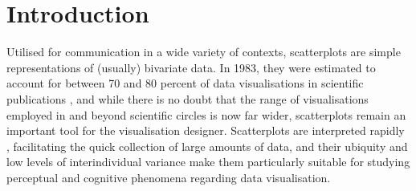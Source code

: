\documentclass[sigconf]{acmart}
\begin{document}



\maketitle

\setlength{\parskip}{-0.1pt}

\section{Introduction}\label{sec-intro}

Utilised for communication in a wide variety of contexts, scatterplots
are simple representations of (usually) bivariate data. In 1983, they
were estimated to account for between 70 and 80 percent of data
visualisations in scientific publications \citep{tufte_1983}, and while
there is no doubt that the range of visualisations employed in and
beyond scientific circles is now far wider, scatterplots remain an
important tool for the visualisation designer. Scatterplots are
interpreted rapidly \citep{rensink_2014}, facilitating the quick
collection of large amounts of data, and their ubiquity
\citep{tufte_1983} and low levels of interindividual variance
\citep{kay_2015} make them particularly suitable for studying perceptual
and cognitive phenomena regarding data visualisation.
\end{document}

